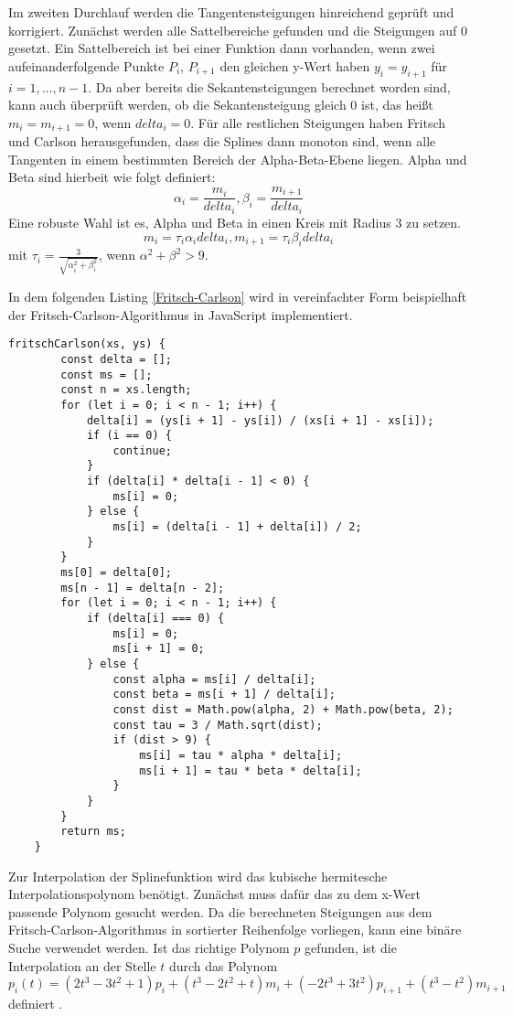 Im zweiten Durchlauf werden die Tangentensteigungen hinreichend geprüft und korrigiert. Zunächst werden alle Sattelbereiche gefunden und die Steigungen auf $0$ gesetzt. Ein Sattelbereich ist bei einer Funktion dann vorhanden, wenn zwei aufeinanderfolgende Punkte $P_i$, $P_{i+1}$ den gleichen y-Wert haben $y_i=y_{i+1}$ für $i=1,\dots,n-1$. Da aber bereits die Sekantensteigungen berechnet worden sind, kann auch überprüft werden, ob die Sekantensteigung gleich $0$ ist, das heißt $m_i=m_{i+1}=0$, wenn $delta_i=0$. Für alle restlichen Steigungen haben Fritsch und Carlson herausgefunden, dass die Splines dann monoton sind, wenn alle Tangenten in einem bestimmten Bereich der Alpha-Beta-Ebene liegen.
Alpha und Beta sind hierbeit wie folgt definiert: 
$$\alpha_i =\frac{m_i}{delta_i}, \beta_i =\frac{m_{i+1}}{delta_i}$$
Eine robuste Wahl ist es, Alpha und Beta in einen Kreis mit Radius 3 zu setzen.
$$m_i=\tau_i\alpha_i delta_i, m_{i+1}=\tau_i\beta_i delta_i$$ mit $\tau_i=\frac{3}{\sqrt{\alpha_i^2+\beta_i^2}}$, wenn $\alpha^2+\beta^2>9$. \cite{Fritschcarlson:1980}

In dem folgenden Listing \ref{Fritsch-Carlson} wird in vereinfachter Form beispielhaft der Fritsch-Carlson-Algorithmus in JavaScript implementiert.
\begin{lstlisting}[caption=Fritsch-Carlson Methode,label=Fritsch-Carlson]
    fritschCarlson(xs, ys) {
        const delta = [];
        const ms = [];
        const n = xs.length;
        for (let i = 0; i < n - 1; i++) {
            delta[i] = (ys[i + 1] - ys[i]) / (xs[i + 1] - xs[i]);
            if (i == 0) {
                continue;
            }
            if (delta[i] * delta[i - 1] < 0) {
                ms[i] = 0;
            } else {
                ms[i] = (delta[i - 1] + delta[i]) / 2;
            }
        }
        ms[0] = delta[0];
        ms[n - 1] = delta[n - 2];
        for (let i = 0; i < n - 1; i++) {
            if (delta[i] === 0) {
                ms[i] = 0;
                ms[i + 1] = 0;
            } else {
                const alpha = ms[i] / delta[i];
                const beta = ms[i + 1] / delta[i];
                const dist = Math.pow(alpha, 2) + Math.pow(beta, 2);
                const tau = 3 / Math.sqrt(dist);
                if (dist > 9) {
                    ms[i] = tau * alpha * delta[i];
                    ms[i + 1] = tau * beta * delta[i];
                }
            }
        }
        return ms;
    }
\end{lstlisting}

Zur Interpolation der Splinefunktion wird das kubische hermitesche Interpolationspolynom benötigt. Zunächst muss dafür das zu dem x-Wert passende Polynom gesucht werden. Da die berechneten Steigungen aus dem Fritsch-Carlson-Algorithmus in sortierter Reihenfolge vorliegen, kann eine binäre Suche verwendet werden. Ist das richtige Polynom $p$ gefunden, ist die Interpolation an der Stelle $t$ durch das Polynom
$$p_i(t)=(2t^3-3t^2+1)p_i+(t^3-2t^2+t)m_i+(-2t^3+3t^2)p_{i+1}+(t^3-t^2)m_{i+1}$$
definiert \cite{Pat:2009}.

